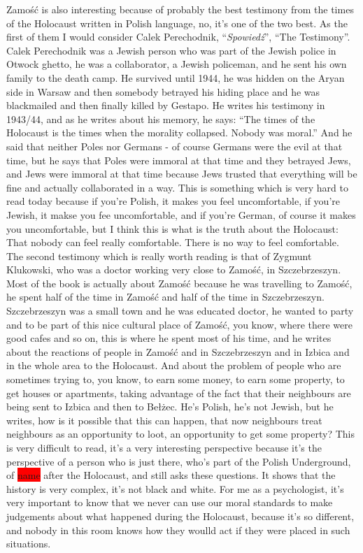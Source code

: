 Zamość is also interesting because of probably the best testimony from the times of the Holocaust written in Polish language, no, it's one of the two best. As the first of them I would consider Calek Perechodnik, ``\textit{Spowiedź}'', ``The Testimony''. Calek Perechodnik was a Jewish person who was part of the Jewish police in Otwock ghetto, he was a collaborator, a Jewish policeman, and he sent his own family to the death camp. He survived until 1944, he was hidden on the Aryan side in Warsaw and then somebody betrayed his hiding place and he was blackmailed and then finally killed by Gestapo. He writes his testimony in 1943/44, and as he writes about his memory, he says: ``The times of the Holocaust is the times when the morality collapsed. Nobody was moral.'' And he said that neither Poles nor Germans - of course Germans were the evil at that time, but he says that Poles were immoral at that time and they betrayed Jews, and Jews were immoral at that time because Jews trusted that everything will be fine and actually collaborated in a way. This is something which is very hard to read today because if you're Polish, it makes you feel uncomfortable, if you're Jewish, it makse you fee uncomfortable, and if you're German, of course it makes you uncomfortable, but I think this is what is the truth about the Holocaust: That nobody can feel really comfortable. There is no way to feel comfortable. The second testimony which is really worth reading is that of Zygmunt Klukowski, who was a doctor working very close to Zamość, in Szczebrzeszyn. Most of the book is actually about Zamość because he was travelling to Zamość, he spent half of the time in Zamość and half of the time in Szczebrzeszyn. Szczebrzeszyn was a small town and he was educated doctor, he wanted to party and to be part of this nice cultural place of Zamość, you know, where there were good cafes and so on, this is where he spent most of his time, and he writes about the reactions of people in Zamość and in Szczebrzeszyn and in Izbica and in the whole area to the Holocaust. And about the problem of people who are sometimes trying to, you know, to earn some money, to earn some property, to get houses or apartments, taking advantage of the fact that their neighbours are being sent to Izbica and then to Bełżec. He's Polish, he's not Jewish, but he writes, how is it possible that this can happen, that now neighbours treat neighbours as an opportunity to loot, an opportunity to get some property? This is very difficult to read, it's a very interesting perspective because it's the perspective of a person who is just there, who's part of the Polish Underground, of \colorbox{red}{name} after the Holocaust, and still asks these questions. It shows that the history is very complex, it’s not black and white. For me as a psychologist, it’s very important to know that we never can use our moral standards to make judgements about what happened during the Holocaust, because it’s so different, and nobody in this room knows how they woulld act if they were placed in such situations.

